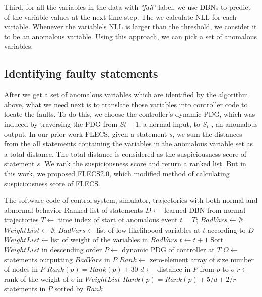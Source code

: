 Third, for all the variables in the data with {\it "fail"} label, we use DBNs to predict of the variable values at the next time step. The we calculate NLL for each variable. Whenever the variable’s NLL is larger than the threshold, we consider it to be an anomalous variable. Using this approach, we can pick a set of anomalous variables.

\subsection{Identifying faulty statements}
After we get a set of anomalous variables which are identified by the algorithm above, what we need next is to translate those variables into controller code to locate the faults. To do this,
we choose the controller’s dynamic PDG, which was induced by traversing the PDG from $S{t-1}$, a normal input, to $S_t$ , an anomalous output. In our prior work FLECS, given a statement $s$, we sum the distances from the all statements containing the variables in the anomalous variable set as a total distance. The total distance is considered as the suspiciousness score of statement $s$. We rank the suspiciousness score and return a ranked list. But in this work, we proposed FLECS2.0, which modified method of calculating suspiciousness score of FLECS. 

\renewcommand{\algorithmicrequire}{\textbf{Input:}}
\renewcommand{\algorithmicensure}{\textbf{Output:}}
\begin{algorithm}
  \label{flecs2.0}
  \begin{algorithmic}[1]
    \Require The software code of control system, simulator, trajectories with both normal and abnormal behavior
    \Ensure Ranked list of statements
    \State $D\leftarrow$ learned DBN from normal trajectories
    \State $T\leftarrow$ time index of start of anomalous event
    \State $t=T$; $BadVars\leftarrow \emptyset$; $WeightList\leftarrow \emptyset$; 
    	\State $BadVars\leftarrow$list of low-likelihoood variables at $t$ according to $D$
	\State $WeightList\leftarrow$list of weight of the variables in $BadVars$
	\State $t \leftarrow t+1$
    \EndWhile
    \State Sort $WeightList$ in descending order
    \State $P\leftarrow$ dynamic PDG of controller at $T$
    \State $O\leftarrow$ statements outputting $BadVars$ in $P$
    \State $Rank\leftarrow$ zero-element array of size number of nodes in $P$  
            		\State $Rank(p)=Rank(p)+30$
			\State $d \leftarrow$ distance in $P$ from $p$ to $o$
			\State $r \leftarrow$ rank of the weight of $o$ in $WeightList$
            		\State $Rank(p)=Rank(p)+5/d+2/r$
        		\EndIf
   	    \EndFor
    \EndFor
    \Return statements in $P$ sorted by $Rank$
  \end{algorithmic}
\end{algorithm}



